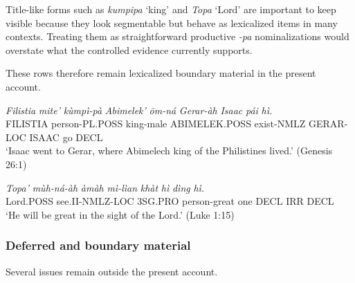 \documentclass[
  11pt,
  a4paper,
]{article}
\newcommand{\tdim}[1]{\textit{#1}}
\newcommand{\tdimword}[1]{\textit{#1}}
\renewcommand{\textsc}[1]{{\footnotesize\MakeUppercase{#1}}}
\newcommand{\glossquote}[1]{`#1'}
\begin{document}
Title-like forms such as \tdim{kumpipa} \glossquote{king} and
\tdim{Topa} \glossquote{Lord} are important to keep visible because they
look segmentable but behave as lexicalized items in many contexts.
Treating them as straightforward productive \tdim{-pa} nominalizations
would overstate what the controlled evidence currently supports.

These rows therefore remain lexicalized boundary material in the present
account.

\begin{exe}
\ex \label{ex:nmlz-kumpipa-gen26}
\gll \tdimword{Filistia} \tdimword{mite'} \tdimword{kùmpì-pà} \tdimword{Abimelek'} \tdimword{ōm-ná} \tdimword{Gerar-àh} \tdimword{Isaac} \tdimword{pái} \tdimword{hì.} \\
     \textsc{filistia} person-\textsc{pl}.\textsc{poss} king-male \textsc{abimelek}.\textsc{poss} exist-\textsc{nmlz} \textsc{gerar}-\textsc{loc} \textsc{isaac} go \textsc{decl} \\
\glt \glossquote{Isaac went to Gerar, where Abimelech king of the Philistines lived.} (Genesis 26:1)
\end{exe}

\begin{exe}
\ex \label{ex:nmlz-Topa-luke1}
\gll \tdimword{Topa'} \tdimword{mùh-ná-àh} \tdimword{àmàh} \tdimword{mì-lìan} \tdimword{khàt} \tdimword{hì} \tdimword{dìng} \tdimword{hì.} \\
     Lord.\textsc{poss} see.\textsc{ii}-\textsc{nmlz}-\textsc{loc} \textsc{3sg}.\textsc{pro} person-great one \textsc{decl} \textsc{irr} \textsc{decl} \\
\glt \glossquote{He will be great in the sight of the Lord.} (Luke 1:15)
\end{exe}

\subsubsection{Deferred and boundary
material}\label{deferred-and-boundary-material-8}

Several issues remain outside the present account.
\end{document}
